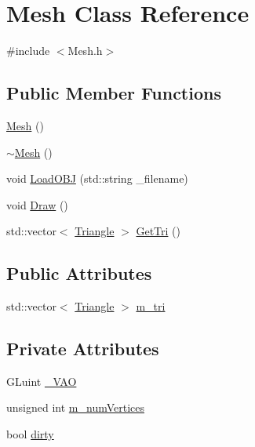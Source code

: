 \hypertarget{class_mesh}{}\section{Mesh Class Reference}
\label{class_mesh}


{\ttfamily \#include $<$Mesh.\+h$>$}

\subsection*{Public Member Functions}
\begin{DoxyCompactItemize}
\item 
\hyperlink{class_mesh_a2af137f1571af89172b9c102302c416b}{Mesh} ()
\item 
\hyperlink{class_mesh_a5efe4da1a4c0971cfb037bd70304c303}{$\sim$\+Mesh} ()
\item 
void \hyperlink{class_mesh_ab8e99c938f9582a77b893231961af07b}{Load\+O\+BJ} (std\+::string \+\_\+filename)
\item 
void \hyperlink{class_mesh_afdd95c079fd0442afef8a6c421c8bfc9}{Draw} ()
\item 
std\+::vector$<$ \hyperlink{struct_triangle}{Triangle} $>$ \hyperlink{class_mesh_aa5879d3423821995b768a85130449999}{Get\+Tri} ()
\end{DoxyCompactItemize}
\subsection*{Public Attributes}
\begin{DoxyCompactItemize}
\item 
std\+::vector$<$ \hyperlink{struct_triangle}{Triangle} $>$ \hyperlink{class_mesh_adaffa1f6ca5a7bcd7ec504e55fb9a879}{m\+\_\+tri}
\end{DoxyCompactItemize}
\subsection*{Private Attributes}
\begin{DoxyCompactItemize}
\item 
G\+Luint \hyperlink{class_mesh_a6616843f51a26a77509d60e73ed59a12}{\+\_\+\+V\+AO}
\item 
unsigned int \hyperlink{class_mesh_a24247a0be98471bfebe095f9ba586791}{m\+\_\+num\+Vertices}
\item 
bool \hyperlink{class_mesh_a1a3614030c454e977cc94c4fc32b46b4}{dirty}
\end{DoxyCompactItemize}


